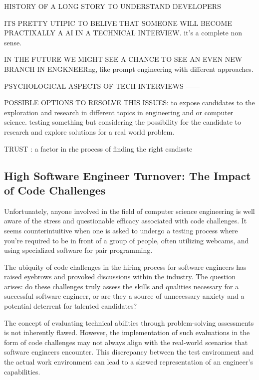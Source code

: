 \documentclass[
    a4paper, %
    10pt, %
    unnumberedsections, %
    twoside, %
]{LTJournalArticle}
\begin{document}






HISTORY OF A LONG STORY TO UNDERSTAND DEVELOPERS 



ITS PRETTY UTIPIC TO BELIVE THAT SOMEONE WILL BECOME PRACTIXALLY A AI IN A TECHNICAL INTERVIEW. it's a complete non sense. 


IN THE FUTURE WE MIGHT SEE A CHANCE TO SEE AN EVEN NEW BRANCH IN ENGKNEERng, like prompt engineering with different approaches.


PSYCHOLOGICAL ASPECTS OF TECH INTERVIEWS 
——


POSSIBLE OPTIONS TO RESOLVE THIS ISSUES:
to expose candidates to the exploration and research in different topics in engineering and or computer science. testing something but considering the possibility for the candidate to research and explore solutions for a real world problem. 



TRUST : a factor in rhe process of finding the right csndisste 








\subsection{High Software Engineer Turnover: The Impact of Code Challenges}

Unfortunately, anyone involved in the field of computer science engineering is well aware of the stress and questionable efficacy associated with code challenges. It seems counterintuitive when one is asked to undergo a testing process where you're required to be in front of a group of people, often utilizing webcams, and using specialized software for pair programming.

The ubiquity of code challenges in the hiring process for software engineers has raised eyebrows and provoked discussions within the industry. The question arises: do these challenges truly assess the skills and qualities necessary for a successful software engineer, or are they a source of unnecessary anxiety and a potential deterrent for talented candidates?

The concept of evaluating technical abilities through problem-solving assessments is not inherently flawed. However, the implementation of such evaluations in the form of code challenges may not always align with the real-world scenarios that software engineers encounter. This discrepancy between the test environment and the actual work environment can lead to a skewed representation of an engineer's capabilities.
\end{document}
